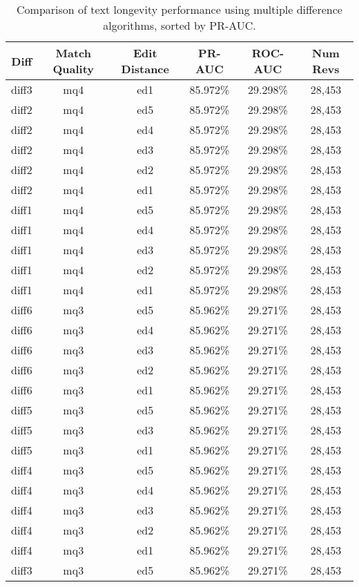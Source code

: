 \begin{table}[tbph]
\begin{center}
\begin{tabular}{|c|c|c||c|c|c|}
\hline
Diff & Match Quality & Edit Distance & PR-AUC & ROC-AUC & Num Revs \\
\hline
\hline
diff3 & mq4 & ed1 & 85.972\% & 29.298\% & 28,453 \\
diff2 & mq4 & ed5 & 85.972\% & 29.298\% & 28,453 \\
diff2 & mq4 & ed4 & 85.972\% & 29.298\% & 28,453 \\
diff2 & mq4 & ed3 & 85.972\% & 29.298\% & 28,453 \\
diff2 & mq4 & ed2 & 85.972\% & 29.298\% & 28,453 \\
diff2 & mq4 & ed1 & 85.972\% & 29.298\% & 28,453 \\
diff1 & mq4 & ed5 & 85.972\% & 29.298\% & 28,453 \\
diff1 & mq4 & ed4 & 85.972\% & 29.298\% & 28,453 \\
diff1 & mq4 & ed3 & 85.972\% & 29.298\% & 28,453 \\
diff1 & mq4 & ed2 & 85.972\% & 29.298\% & 28,453 \\
diff1 & mq4 & ed1 & 85.972\% & 29.298\% & 28,453 \\
diff6 & mq3 & ed5 & 85.962\% & 29.271\% & 28,453 \\
diff6 & mq3 & ed4 & 85.962\% & 29.271\% & 28,453 \\
diff6 & mq3 & ed3 & 85.962\% & 29.271\% & 28,453 \\
diff6 & mq3 & ed2 & 85.962\% & 29.271\% & 28,453 \\
diff6 & mq3 & ed1 & 85.962\% & 29.271\% & 28,453 \\
diff5 & mq3 & ed5 & 85.962\% & 29.271\% & 28,453 \\
diff5 & mq3 & ed3 & 85.962\% & 29.271\% & 28,453 \\
diff5 & mq3 & ed1 & 85.962\% & 29.271\% & 28,453 \\
diff4 & mq3 & ed5 & 85.962\% & 29.271\% & 28,453 \\
diff4 & mq3 & ed4 & 85.962\% & 29.271\% & 28,453 \\
diff4 & mq3 & ed3 & 85.962\% & 29.271\% & 28,453 \\
diff4 & mq3 & ed2 & 85.962\% & 29.271\% & 28,453 \\
diff4 & mq3 & ed1 & 85.962\% & 29.271\% & 28,453 \\
diff3 & mq3 & ed5 & 85.962\% & 29.271\% & 28,453 \\
\hline
\end{tabular}
\end{center}
\caption{Comparison of text longevity performance using
    multiple difference algorithms, sorted by PR-AUC.}
\label{tab:textshoutC}
\end{table}
